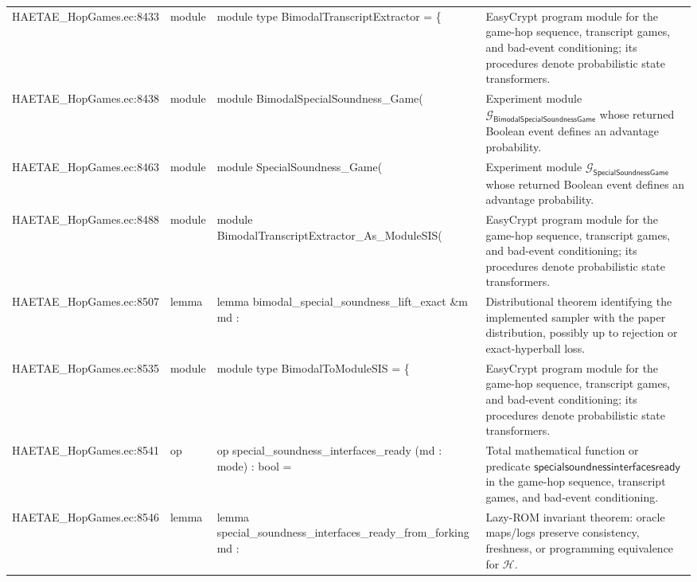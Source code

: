 \documentclass[10pt]{article}
\begin{document}
\begin{longtable}{L{0.11\textwidth}L{0.055\textwidth}L{0.385\textwidth}L{0.41\textwidth}}
HAETAE\_\allowbreak{}HopGames.\allowbreak{}ec:\allowbreak{}8433 & module & {\ttfamily\scriptsize module type BimodalTranscriptExtractor = \{} & EasyCrypt program module for the game-hop sequence, transcript games, and bad-event conditioning; its procedures denote probabilistic state transformers. \\
HAETAE\_\allowbreak{}HopGames.\allowbreak{}ec:\allowbreak{}8438 & module & {\ttfamily\scriptsize module BimodalSpecialSoundness\_\allowbreak{}Game(} & Experiment module $\mathcal G_{\mathsf{BimodalSpecialSoundnessGame}}$ whose returned Boolean event defines an advantage probability. \\
HAETAE\_\allowbreak{}HopGames.\allowbreak{}ec:\allowbreak{}8463 & module & {\ttfamily\scriptsize module SpecialSoundness\_\allowbreak{}Game(} & Experiment module $\mathcal G_{\mathsf{SpecialSoundnessGame}}$ whose returned Boolean event defines an advantage probability. \\
HAETAE\_\allowbreak{}HopGames.\allowbreak{}ec:\allowbreak{}8488 & module & {\ttfamily\scriptsize module BimodalTranscriptExtractor\_\allowbreak{}As\_\allowbreak{}ModuleSIS(} & EasyCrypt program module for the game-hop sequence, transcript games, and bad-event conditioning; its procedures denote probabilistic state transformers. \\
HAETAE\_\allowbreak{}HopGames.\allowbreak{}ec:\allowbreak{}8507 & lemma & {\ttfamily\scriptsize lemma bimodal\_\allowbreak{}special\_\allowbreak{}soundness\_\allowbreak{}lift\_\allowbreak{}exact \&m md :} & Distributional theorem identifying the implemented sampler with the paper distribution, possibly up to rejection or exact-hyperball loss. \\
HAETAE\_\allowbreak{}HopGames.\allowbreak{}ec:\allowbreak{}8535 & module & {\ttfamily\scriptsize module type BimodalToModuleSIS = \{} & EasyCrypt program module for the game-hop sequence, transcript games, and bad-event conditioning; its procedures denote probabilistic state transformers. \\
HAETAE\_\allowbreak{}HopGames.\allowbreak{}ec:\allowbreak{}8541 & op & {\ttfamily\scriptsize op special\_\allowbreak{}soundness\_\allowbreak{}interfaces\_\allowbreak{}ready (md : mode) : bool =} & Total mathematical function or predicate $\mathsf{specialsoundnessinterfacesready}$ in the game-hop sequence, transcript games, and bad-event conditioning. \\
HAETAE\_\allowbreak{}HopGames.\allowbreak{}ec:\allowbreak{}8546 & lemma & {\ttfamily\scriptsize lemma special\_\allowbreak{}soundness\_\allowbreak{}interfaces\_\allowbreak{}ready\_\allowbreak{}from\_\allowbreak{}forking md :} & Lazy-ROM invariant theorem: oracle maps/logs preserve consistency, freshness, or programming equivalence for $\mathcal H$. \\

\end{longtable}
\end{document}

